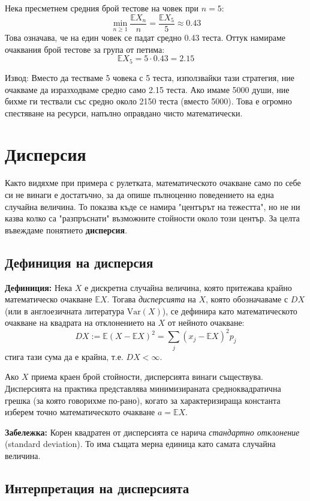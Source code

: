 \documentclass{article}
\begin{document}
Нека пресметнем средния брой тестове на човек при $n = 5$:
\[ \min_{n \ge 1} \frac{\mathbb{E}X_n}{n} = \frac{\mathbb{E}X_5}{5} \approx 0.43 \]
Това означава, че на един човек се падат средно 0.43 теста. Оттук намираме очаквания брой тестове за група от петима:
\[ \mathbb{E}X_5 = 5 \cdot 0.43 = 2.15 \]

Извод: Вместо да тестваме 5 човека с 5 теста, използвайки тази стратегия, ние очакваме да изразходваме средно само 2.15 теста. Ако имаме 5000 души, ние бихме ги тествали със средно около 2150 теста (вместо 5000). Това е огромно спестяване на ресурси, напълно оправдано чисто математически.

\section{Дисперсия}

Както видяхме при примера с рулетката, математическото очакване само по себе си не винаги е достатъчно, за да опише пълноценно поведението на една случайна величина. То показва къде се намира "центърът на тежестта", но не ни казва колко са "разпръснати" възможните стойности около този център. За целта въвеждаме понятието \textbf{дисперсия}.

\subsection{Дефиниция на дисперсия}

\textbf{Дефиниция:} Нека $X$ е дискретна случайна величина, която притежава крайно математическо очакване $\mathbb{E}X$. Тогава \textit{дисперсията} на $X$, която обозначаваме с $DX$ (или в англоезичната литература $\text{Var}(X)$), се дефинира като математическото очакване на квадрата на отклонението на $X$ от нейното очакване:
\[ DX := \mathbb{E}(X - \mathbb{E}X)^2 = \sum_{j} (x_j - \mathbb{E}X)^2 p_j \]
стига тази сума да е крайна, т.е. $DX < \infty$.

Ако $X$ приема краен брой стойности, дисперсията винаги съществува. Дисперсията на практика представлява минимизираната средноквадратична грешка (за която говорихме по-рано), когато за характеризираща константа изберем точно математическото очакване $a = \mathbb{E}X$.

\textbf{Забележка:} Корен квадратен от дисперсията се нарича \textit{стандартно отклонение} (standard deviation). То има същата мерна единица като самата случайна величина. 

\subsection{Интерпретация на дисперсията}
\end{document}

